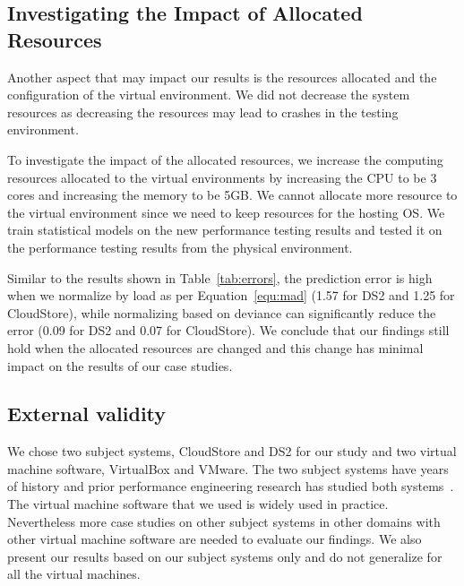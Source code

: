 	
\subsection{Investigating the Impact of Allocated Resources}

Another aspect that may impact our results is the resources allocated and the configuration of the virtual environment. We did not decrease the system resources as decreasing the resources may lead to crashes in the testing environment.

To investigate the impact of the allocated resources, we increase the computing resources allocated to the virtual environments by increasing the CPU to be 3 cores and increasing the memory to be 5GB. We cannot allocate more resource to the virtual environment since we need to keep resources for the hosting OS. We train statistical models on the new performance testing results and tested it on the performance testing results from the physical environment. 

Similar to the results shown in Table~\ref{tab:errors}, the prediction error is high when we normalize by load as per Equation~\ref{equ:mad} (1.57 for DS2 and 1.25 for CloudStore), while normalizing based on deviance can significantly reduce the error (0.09 for DS2 and 0.07 for CloudStore). We conclude that our findings still hold when the allocated resources are changed and this change has minimal impact on the results of our case studies.


\subsection{External validity}
We chose two subject systems, CloudStore and DS2 for our study and two virtual machine software, VirtualBox and VMware. The two subject systems have years of history and prior performance engineering research has studied both systems~\cite{jackicsm2009,Nguyen:2012:ADP:2188286.2188344,tarekmsr16}. The virtual machine software that we used is widely used in practice. Nevertheless more case studies on other subject systems in other domains with other virtual machine software are needed to evaluate our findings. We also present our results based on our subject systems only and do not generalize for all the virtual machines.


